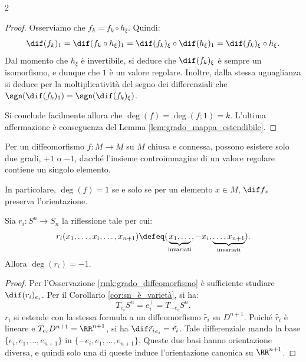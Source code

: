 \begin{multicols*}{2}
\begin{proof}
        Osserviamo che $f_k = f_k \circ h_\xi$. Quindi:
        \[
            \dif (f_k)_1 = \dif (f_k \circ h_\xi)_1 = \dif (f_k)_\xi \circ \dif (h_\xi)_1 = \dif (f_k)_\xi \circ h_\xi.
        \]
        Dal momento che $h_\xi$ è invertibile, si deduce che $\dif (f_k)_\xi$ è sempre un isomorfismo, e
        dunque che $1$ è un valore regolare. Inoltre, dalla stessa uguaglianza si deduce per la
        moltiplicatività del segno dei differenziali che $\sgn(\dif (f_k)_1) = \sgn(\dif (f_k)_\xi)$. \smallskip

        Si conclude facilmente allora che $\deg(f) = \deg(f; 1) = k$. L'ultima affermazione è conseguenza
        del Lemma \ref{lem:grado_mappa_estendibile}.
    \end{proof}

    \begin{remark} \label{rmk:grado_diffeomorfismo}
        Per un diffeomorfismo $f : M \to M$ su $M$ chiusa e connessa,
        possono esistere solo due gradi, $+1$ o $-1$, dacché l'insieme
        controimmagine di un valore regolare contiene un singolo elemento. \smallskip

        In particolare, $\deg(f) = 1$ se e solo se per un elemento $x \in M$, $\dif f_x$
        preserva l'orientazione.
    \end{remark}

    \begin{lemma} \label{lem:grado_riflessione}
        Sia $r_i : S^n \to S_n$ la riflessione tale per cui:
        \[
            r_i(x_1, \ldots, x_i, \ldots, x_{n+1}) \defeq (\underbrace{x_1, \ldots}_{\textnormal{invariati}}, -x_i, \underbrace{\ldots, x_{n+1}}_{\textnormal{invariati}}).
        \]
        Allora $\deg(r_i) = -1$.
    \end{lemma}

    \begin{proof}
        Per l'Osservazione \ref{rmk:grado_diffeomorfismo} è sufficiente studiare $\dif (r_i)_{e_i}$.
        Per il Corollario \ref{cor:sn_è_varietà},
        si ha:
        \[
            T_{e_i} S^n = e_i^\perp = T_{-e_i} S^n.
        \]
        $r_i$ si estende con la stessa formula a un diffeomorfismo $\tilde{r_i}$ su $D^{n+1}$. Poiché
        $\tilde{r_i}$ è lineare e $T_{e_i} D^{n+1} = \RR^{n+1}$, si ha
        $\dif \tilde{r_i}_{e_i} = \tilde{r_i}$. Tale differenziale manda la base $\{e_i, e_1, \ldots, e_{n+1}\}$
        in $\{-e_i, e_1, \ldots, e_{n+1}\}$. Queste due basi hanno orientazione diversa, e quindi solo
        una di queste induce l'orientazione canonica su $\RR^{n+1}$. \smallskip


\end{proof}
\end{multicols*}
